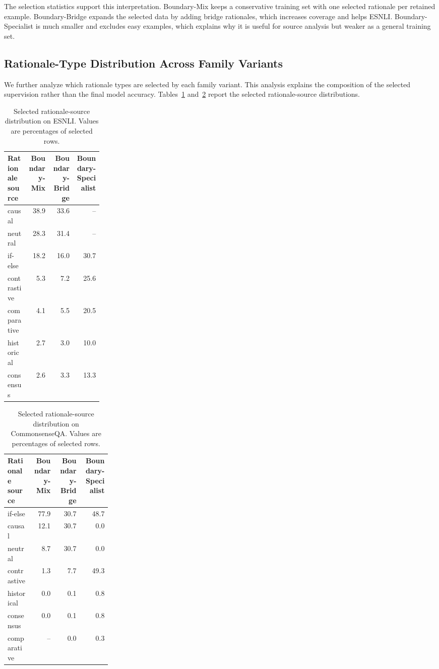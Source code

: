 The selection statistics support this interpretation. Boundary-Mix keeps a conservative training set with one selected rationale per retained example. Boundary-Bridge expands the selected data by adding bridge rationales, which increases coverage and helps ESNLI. Boundary-Specialist is much smaller and excludes easy examples, which explains why it is useful for source analysis but weaker as a general training set.

\subsection{Rationale-Type Distribution Across Family Variants}
\label{sec:rationale-type-distribution}

We further analyze which rationale types are selected by each family variant. This analysis explains the composition of the selected supervision rather than the final model accuracy. Tables~\ref{tab:esnli-rationale-distribution} and~\ref{tab:cqa-rationale-distribution} report the selected rationale-source distributions.

\begin{table}[H]
\centering
\caption{Selected rationale-source distribution on ESNLI. Values are percentages of selected rows.}
\label{tab:esnli-rationale-distribution}
\begin{tabular}{p{0.22\linewidth} r r r}
\hline
Rationale source & Boundary-Mix & Boundary-Bridge & Boundary-Specialist \\
\hline
causal & 38.9 & 33.6 & -- \\
neutral & 28.3 & 31.4 & -- \\
if-else & 18.2 & 16.0 & 30.7 \\
contrastive & 5.3 & 7.2 & 25.6 \\
comparative & 4.1 & 5.5 & 20.5 \\
historical & 2.7 & 3.0 & 10.0 \\
consensus & 2.6 & 3.3 & 13.3 \\
\hline
\end{tabular}
\end{table}

\begin{table}[H]
\centering
\caption{Selected rationale-source distribution on CommonsenseQA. Values are percentages of selected rows.}
\label{tab:cqa-rationale-distribution}
\begin{tabular}{p{0.24\linewidth} r r r}
\hline
Rationale source & Boundary-Mix & Boundary-Bridge & Boundary-Specialist \\
\hline
if-else & 77.9 & 30.7 & 48.7 \\
causal & 12.1 & 30.7 & 0.0 \\
neutral & 8.7 & 30.7 & 0.0 \\
contrastive & 1.3 & 7.7 & 49.3 \\
historical & 0.0 & 0.1 & 0.8 \\
consensus & 0.0 & 0.1 & 0.8 \\
comparative & -- & 0.0 & 0.3 \\
\hline
\end{tabular}
\end{table}

